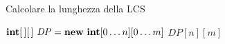 \begin{frame}[fragile]{Calcolare la lunghezza della LCS}

\begin{Procedure}
\caption[A]{\INTEGER \LCS($\Item[\,]\ P,\ \Item[\,]\ T,\ \INTEGER\ n,\ \INTEGER\ m$)}

$\INTARRAY[\,]\ \mathit{DP} = \NEW\ \INTEGER[0 \ldots n][0 \ldots m] $\;
\Return $\mathit{DP}[n][m]$\;

\end{Procedure}


\end{frame}

